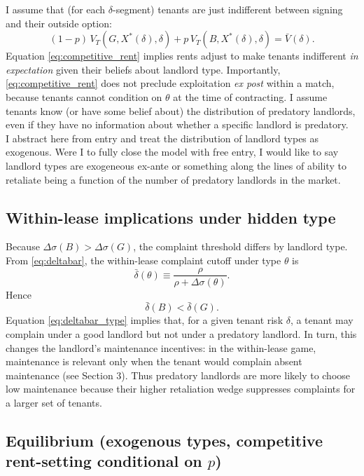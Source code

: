 \documentclass[11pt]{article}
\begin{document}
I assume that (for each $\delta$-segment) tenants are just indifferent between signing and their outside option:
\begin{equation}
(1-p)\,V_T(G,X^*(\delta),\delta) + p\,V_T(B,X^*(\delta),\delta) = \bar V(\delta).
\label{eq:competitive_rent}
\end{equation}
Equation \eqref{eq:competitive_rent} implies rents adjust to make tenants indifferent \emph{in expectation} given their beliefs about landlord type. Importantly, \eqref{eq:competitive_rent} does not preclude exploitation \emph{ex post} within a match, because tenants cannot condition on $\theta$ at the time of contracting. I assume tenants know (or have some belief about) the distribution of predatory landlords, even if they have no information about whether a specific landlord is predatory.\\

I abstract here from entry and treat the distribution of landlord types as exogenous. Were I to fully close the model with free entry, I would like to say landlord types are exogeneous ex-ante or something along the lines of ability to retaliate being a function of the number of predatory landlords in the market.

\subsection{Within-lease implications under hidden type}

Because $\Delta\sigma(B)>\Delta\sigma(G)$, the complaint threshold differs by landlord type. From \eqref{eq:deltabar}, the within-lease complaint cutoff under type $\theta$ is
\[
\bar\delta(\theta) \equiv \frac{\rho}{\rho+\Delta\sigma(\theta)}.
\]
Hence
\begin{equation}
\bar\delta(B) < \bar\delta(G).
\label{eq:deltabar_type}
\end{equation}
Equation \eqref{eq:deltabar_type} implies that, for a given tenant risk $\delta$, a tenant may complain under a good landlord but not under a predatory landlord. In turn, this changes the landlord's maintenance incentives: in the within-lease game, maintenance is relevant only when the tenant would complain absent maintenance (see Section 3). Thus predatory landlords are more likely to choose low maintenance because their higher retaliation wedge suppresses complaints for a larger set of tenants.


\subsection{Equilibrium (exogenous types, competitive rent-setting conditional on $p$)}
\label{sec:eqm_math}
\end{document}
